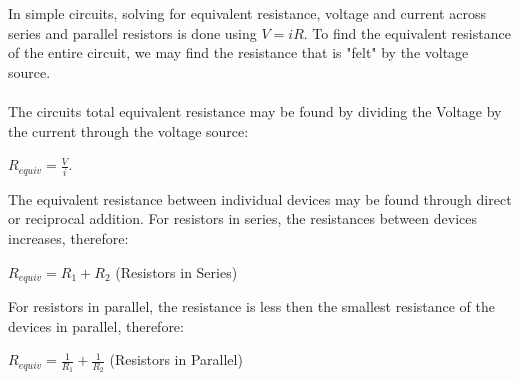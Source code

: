 \documentclass{report}
\begin{document}
\begin{enumerate}
\\
\\In simple circuits, solving for equivalent resistance, voltage and current across series and parallel resistors is done using $\displaystyle V=iR$. To find the equivalent resistance of the entire circuit, we may find the resistance that is "felt" by the voltage source. 
\\
\\The circuits total equivalent resistance may be found by dividing the Voltage by the current through the voltage source: 
\begin{center}
$\displaystyle R_{equiv}=\frac{V}{i}$. 
\end{center}
The equivalent resistance between individual devices may be found through direct or reciprocal addition. For resistors in series, the resistances between devices increases, therefore: 
\begin{center}
$\displaystyle R_{equiv} = R_1 + R_2$ (Resistors in Series)
\end{center}
For resistors in parallel, the resistance is less then the smallest resistance of the devices in parallel, therefore:  
\begin{center}
$\displaystyle R_{equiv}=\frac{1}{R_1} + \frac{1}{R_2}$ (Resistors in Parallel)
\end{center}


\end{enumerate}
\end{document}
